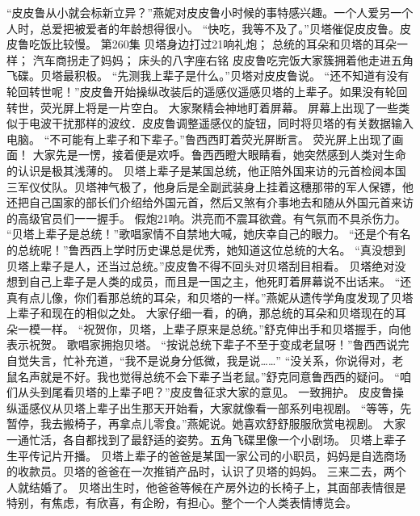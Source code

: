 \documentclass[a4paper,12pt,UTF8,twoside]{ctexbook}
\begin{document}
        “皮皮鲁从小就会标新立异？”燕妮对皮皮鲁小时候的事特感兴趣。一个人爱另一个人时，总爱把被爱者的年龄想得很小。  
        “快吃，我等不及了。”贝塔催促皮皮鲁。皮皮鲁吃饭比较慢。          第260集  
        贝塔身边打过21响礼炮；  
        总统的耳朵和贝塔的耳朵一样；  
        汽车商拐走了妈妈；  
        床头的八字座右铭    
        皮皮鲁吃完饭大家簇拥着他走进五角飞碟。贝塔最积极。  
        “先测我上辈子是什么。”贝塔对皮皮鲁说。  
        “还不知道有没有轮回转世呢！”皮皮鲁开始操纵改装后的遥感仪遥感贝塔的上辈子。如果没有轮回转世，荧光屏上将是一片空白。  
        大家聚精会神地盯着屏幕。  
        屏幕上出现了一些类似于电波干扰那样的波纹．皮皮鲁调整遥感仪的旋钮，同时将贝塔的有关数据输入电脑。  
        “不可能有上辈子和下辈子。”鲁西西盯着荧光屏断言。  
        荧光屏上出现了画面！  
        大家先是一愣，接着便是欢呼。鲁西西瞪大眼睛看，她突然感到人类对生命的认识是极其浅薄的。  
        贝塔上辈子是某国总统，他正陪外国来访的元首检阅本国三军仪仗队。贝塔神气极了，他身后是全副武装身上挂着这穗那带的军人保镖，他还把自己国家的部长们介绍给外国元首，然后又煞有介事地去和随从外国元首来访的高级官员们一一握手。  
        假炮21响。洪亮而不震耳欲聋。有气氛而不具杀伤力。  
        “贝塔上辈子是总统！”歌唱家情不自禁地大喊，她庆幸自己的眼力。  
        “还是个有名的总统呢！”鲁西西上学时历史课总是优秀，她知道这位总统的大名。  
        “真没想到贝塔上辈子是人，还当过总统。”皮皮鲁不得不回头对贝塔刮目相看。  
        贝塔绝对没想到自己上辈子是人类的成员，而且是一国之主，他死盯着屏幕说不出话来。  
        “还真有点儿像，你们看那总统的耳朵，和贝塔的一样。”燕妮从遗传学角度发现了贝塔上辈子和现在的相似之处。  
        大家仔细一看，的确，那总统的耳朵和贝塔现在的耳朵一模一样。        
        “祝贺你，贝塔，上辈子原来是总统。”舒克伸出手和贝塔握手，向他表示祝贺。  
        歌唱家拥抱贝塔。  
        “按说总统下辈子不至于变成老鼠呀！”鲁西西说完自觉失言，忙补充道，“我不是说身分低微，我是说……”  
        “没关系，你说得对，老鼠名声就是不好。我也觉得总统不会下辈子当老鼠。”舒克同意鲁西西的疑问。  
        “咱们从头到尾看贝塔的上辈子吧？”皮皮鲁征求大家的意见。  
        一致拥护。  
        皮皮鲁操纵遥感仪从贝塔上辈子出生那天开始看，大家就像看一部系列电视剧。  
        “等等，先暂停，我去搬椅子，再拿点儿零食。”燕妮说。她喜欢舒舒服服欣赏电视剧。  
        大家一通忙活，各自都找到了最舒适的姿势。五角飞碟里像一个小剧场。  
        贝塔上辈子生平传记片开播。  
        贝塔上辈子的爸爸是某国一家公司的小职员，妈妈是自选商场的收款员。贝塔的爸爸在一次推销产品时，认识了贝塔的妈妈。  
        三来二去，两个人就结婚了。  
        贝塔出生时，他爸爸等候在产房外边的长椅子上，其面部表情很是特别，有焦虑，有欣喜，有企盼，有担心。整个一个人类表情博览会。  
\end{document}
